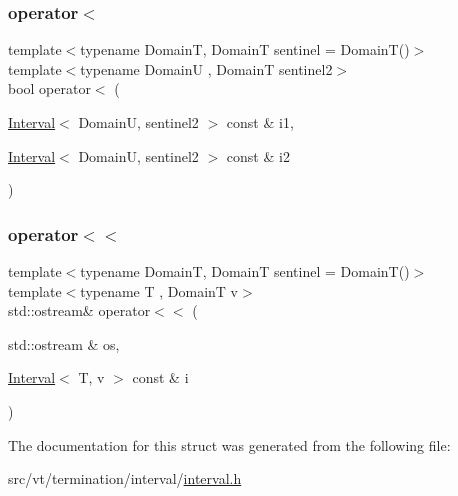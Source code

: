 \subsubsection{\texorpdfstring{operator$<$}{operator<}}
{\footnotesize\ttfamily template$<$typename DomainT, DomainT sentinel = Domain\+T()$>$ \\
template$<$typename DomainU , DomainT sentinel2$>$ \\
bool operator$<$ (\begin{DoxyParamCaption}\item[{\hyperlink{structvt_1_1term_1_1interval_1_1_interval}{Interval}$<$ DomainU, sentinel2 $>$ const \&}]{i1,  }\item[{\hyperlink{structvt_1_1term_1_1interval_1_1_interval}{Interval}$<$ DomainU, sentinel2 $>$ const \&}]{i2 }\end{DoxyParamCaption})\hspace{0.3cm}{\ttfamily [friend]}}

\mbox{\label{structvt_1_1term_1_1interval_1_1_interval_a764fa3f5ff6c49067c4c36a35b498c8b}} 
\subsubsection{\texorpdfstring{operator$<$$<$}{operator<<}}
{\footnotesize\ttfamily template$<$typename DomainT, DomainT sentinel = Domain\+T()$>$ \\
template$<$typename T , DomainT v$>$ \\
std\+::ostream\& operator$<$$<$ (\begin{DoxyParamCaption}\item[{std\+::ostream \&}]{os,  }\item[{\hyperlink{structvt_1_1term_1_1interval_1_1_interval}{Interval}$<$ T, v $>$ const \&}]{i }\end{DoxyParamCaption})\hspace{0.3cm}{\ttfamily [friend]}}



The documentation for this struct was generated from the following file\+:\begin{DoxyCompactItemize}
\item 
src/vt/termination/interval/\hyperlink{interval_8h}{interval.\+h}\end{DoxyCompactItemize}
